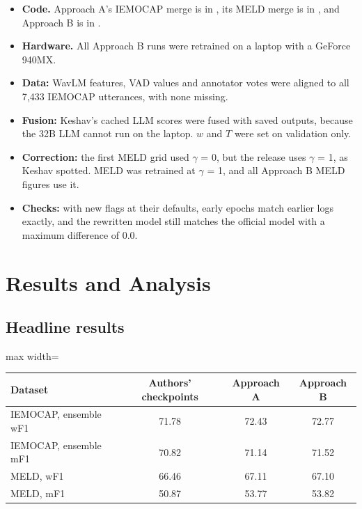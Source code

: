 \documentclass[11pt,a4paper]{article}
\begin{document}
\begin{itemize}
  \item \textbf{Code.} Approach A's IEMOCAP merge is in , its MELD merge is in , and Approach B is in .
  \item \textbf{Hardware.} All Approach B runs were retrained on a laptop with a GeForce 940MX.
  \item \textbf{Data:} WavLM features, VAD values and annotator votes were aligned to all 7,433 IEMOCAP utterances, with none missing.
  \item \textbf{Fusion:} Keshav's cached LLM scores were fused with saved outputs, because the 32B LLM cannot run on the laptop. $w$ and $T$ were set on validation only.
  \item \textbf{Correction:} the first MELD grid used $\gamma$ = 0, but the release uses $\gamma$ = 1, as Keshav spotted. MELD was retrained at $\gamma$ = 1, and all Approach B MELD figures use it.
  \item \textbf{Checks:} with new flags at their defaults, early epochs match earlier logs exactly, and the rewritten model still matches the official model with a maximum difference of 0.0.
\end{itemize}

\section{Results and Analysis}
\label{sec:results}

\subsection{Headline results}

\begin{center}
\begin{adjustbox}{max width=\linewidth}
\begin{tabular}{lccc}
\toprule
Dataset & Authors' checkpoints & Approach A & Approach B \\
\midrule
IEMOCAP, ensemble wF1 & 71.78 & 72.43 & 72.77 \\
IEMOCAP, ensemble mF1 & 70.82 & 71.14 & 71.52 \\
MELD, wF1 & 66.46 & 67.11 & 67.10 \\
MELD, mF1 & 50.87 & 53.77 & 53.82 \\
\bottomrule
\end{tabular}
\end{adjustbox}
\end{center}
\end{document}
